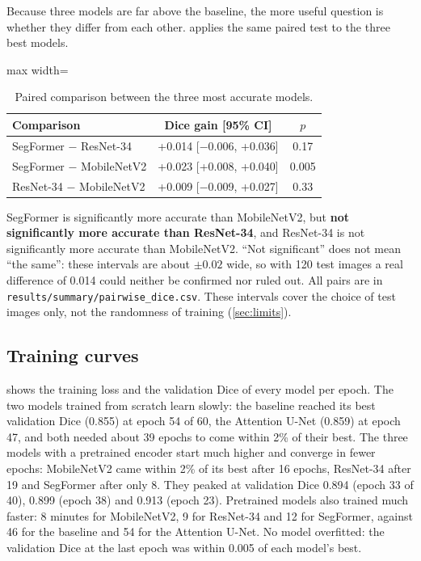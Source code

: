 Because three models are far above the baseline, the more useful question is whether they differ from each
other.  applies the same paired test to the three best models.

\begin{table}[t]
  \centering
  \small
  \begin{adjustbox}{max width=\linewidth}
  \begin{tabular}{@{}lcc@{}}
    \toprule
    Comparison & Dice gain [95\% CI] & $p$ \\
    \midrule
    SegFormer $-$ ResNet-34   & +0.014 [$-$0.006, +0.036] & 0.17  \\
    SegFormer $-$ MobileNetV2 & +0.023 [+0.008, +0.040]   & 0.005 \\
    ResNet-34 $-$ MobileNetV2 & +0.009 [$-$0.009, +0.027] & 0.33  \\
    \bottomrule
  \end{tabular}
  \end{adjustbox}
  \caption{Paired comparison between the three most accurate models.}
  \label{tab:pairwise}
\end{table}

SegFormer is significantly more accurate than MobileNetV2, but \textbf{not significantly more accurate than
ResNet-34}, and ResNet-34 is not significantly more accurate than MobileNetV2. ``Not significant'' does not mean
``the same'': these intervals are about $\pm0.02$ wide, so with 120 test images a real difference of 0.014 could
neither be confirmed nor ruled out. All pairs are in \texttt{results/summary/pairwise\_dice.csv}. These intervals
cover the choice of test images only, not the randomness of training (\cref{sec:limits}).

\subsection{Training curves}
\label{sec:curves}
 shows the training loss and the validation Dice of every model per
epoch. The two models trained from scratch learn slowly: the baseline reached its best validation Dice (0.855)
at epoch 54 of 60, the Attention U-Net (0.859) at epoch 47, and both needed about 39 epochs to come within 2\% of
their best. The three models with a pretrained encoder start much higher and converge in fewer epochs:
MobileNetV2 came within 2\% of its best after 16 epochs, ResNet-34 after 19 and SegFormer after only 8.
They peaked at validation Dice 0.894 (epoch 33 of 40), 0.899 (epoch 38) and 0.913 (epoch 23). Pretrained models
also trained much faster: 8 minutes for MobileNetV2, 9 for ResNet-34 and 12 for SegFormer, against 46 for the
baseline and 54 for the Attention U-Net. No model overfitted: the validation Dice at the last epoch was within
0.005 of each model's best.

